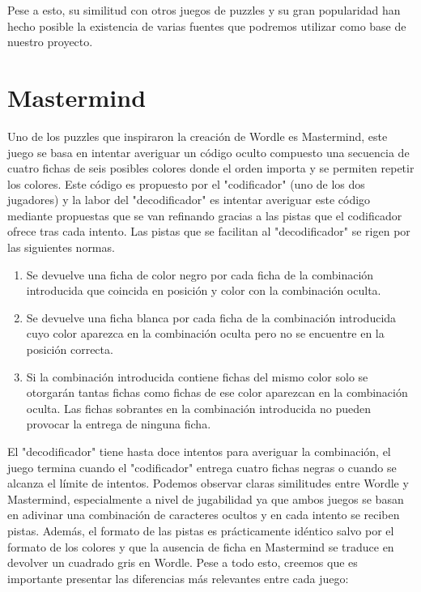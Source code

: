Pese a esto, su similitud con otros juegos de puzzles y su gran popularidad han hecho posible la existencia de varias fuentes
que podremos utilizar como base de nuestro proyecto.

\section{Mastermind}

Uno de los puzzles que inspiraron la creación de Wordle es Mastermind, este juego se basa en intentar averiguar un código oculto compuesto una secuencia de cuatro
fichas de seis posibles colores donde el orden importa y se permiten repetir los colores. Este código es propuesto por el "codificador" (uno de los dos jugadores) y la
labor del "decodificador" es intentar averiguar este código mediante propuestas que se van refinando gracias a las pistas que el codificador ofrece tras cada intento. 
Las pistas que se facilitan al "decodificador" se rigen por las siguientes normas.
\begin{enumerate}
  \item Se devuelve una ficha de color negro por cada ficha de la combinación introducida que coincida en posición y color con la combinación oculta.
  \item Se devuelve una ficha blanca por cada ficha de la combinación introducida cuyo color aparezca en la combinación oculta pero no se encuentre en la posición correcta.
  \item Si la combinación introducida contiene fichas del mismo color solo se otorgarán tantas fichas como fichas de ese color aparezcan en la combinación oculta.
  Las fichas sobrantes en la combinación introducida no pueden provocar la entrega de ninguna ficha.
\end{enumerate}

El "decodificador" tiene hasta doce intentos para averiguar la combinación, el juego termina cuando el "codificador" entrega cuatro fichas negras o cuando se alcanza el límite 
de intentos. Podemos observar claras similitudes entre Wordle y Mastermind, especialmente a nivel de jugabilidad ya que ambos juegos se basan en adivinar una combinación de caracteres
ocultos y en cada intento se reciben pistas. Además, el formato de las pistas es prácticamente idéntico salvo por el formato de los colores y que la ausencia de ficha en Mastermind se 
traduce en devolver un cuadrado gris en Wordle. Pese a todo esto, creemos que es importante presentar las diferencias más relevantes entre cada juego:

